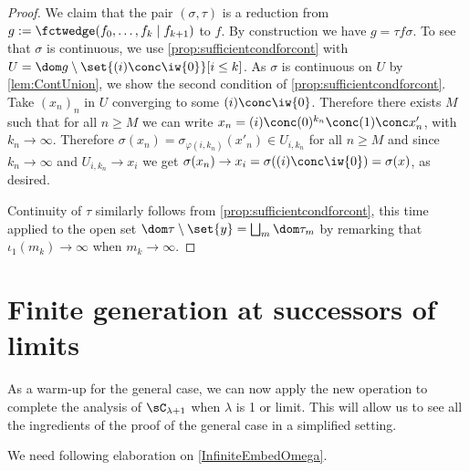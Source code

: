 \begin{proof}
We claim that the pair $(\sigma,\tau)$ is a reduction from $g:=\fctwedge (f_0,\ldots,f_k\mid f_{k+1})$ to $f$. By construction we have $g=\tau f\sigma$.
To see that $\sigma$ is continuous, we use \cref{prop:sufficientcondforcont} with $U=\dom g \setminus \set{(i)\conc \iw{0}}[i\leq k]$.
As $\sigma$ is continuous on $U$ by \cref{lem:ContUnion}, we show the second condition of \cref{prop:sufficientcondforcont}.
Take $(x_n)_n$ in $U$ converging to some $(i)\conc \iw{0}$. Therefore there exists $M$ such that for all $n\geq M$ we can write $x_n=(i)\conc(0)^{k_n}\conc(1) \conc x'_n$,
with $k_n\to \infty$. Therefore $\sigma(x_n)=\sigma_{\varphi(i,k_n)}(x'_n)\in U_{i,k_n}$ for all $n\geq M$ and since $k_n\to \infty$ and $U_{i,k_n}\to x_i$ we get $\sigma(x_n)\to x_i=\sigma((i)\conc\iw{0})=\sigma(x)$, as desired.

Continuity of $\tau$ similarly follows from \cref{prop:sufficientcondforcont}, this time applied to the open set $\dom \tau \setminus \set{y}=\bigsqcup_m \dom \tau_m$ by remarking that $\iota_1(m_k)\to \infty$ when $m_k\to \infty$. 
\end{proof}

\section{Finite generation at successors of limits}

As a warm-up for the general case, we can now apply the new operation to complete the analysis of $\sC_{\lambda+1}$ when $\lambda$ is 1 or limit.
This will allow us to see all the ingredients of the proof of the general case in a simplified setting.

We need following elaboration on \cref{InfiniteEmbedOmega}. 

